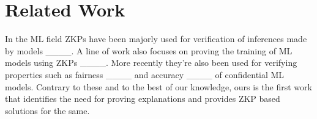 \section{Related Work}
In the ML field ZKPs have been majorly used for verification of inferences made by models ____. A line of work also focuses on proving the training of ML models using ZKPs ____. More recently they're also been used for verifying properties such as fairness ____ and accuracy ____ of confidential ML models.  Contrary to these and to the best of our knowledge, ours is the first work that identifies the need for proving explanations and provides ZKP based solutions for the same.